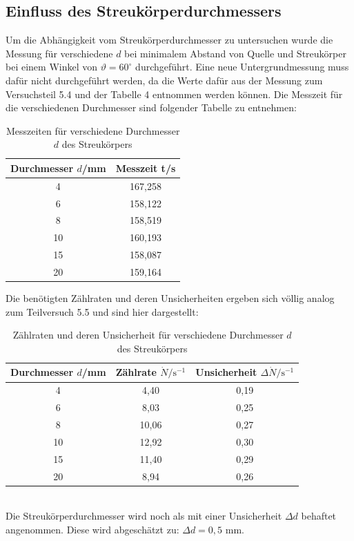 \documentclass[german,  %
parskip=full,  %
]{scrartcl}
\begin{document}
\subsection{Einfluss des Streukörperdurchmessers}
Um die Abhängigkeit vom Streukörperdurchmesser zu untersuchen wurde die Messung für verschiedene $d$ bei minimalem Abstand von Quelle und Streukörper bei einem Winkel von $\vartheta = 60^{\circ}$ durchgeführt. Eine neue Untergrundmessung muss dafür nicht durchgeführt werden, da die Werte dafür aus der Messung zum Versuchsteil 5.4 und der Tabelle 4 entnommen werden können. Die Messzeit für die verschiedenen Durchmesser sind folgender Tabelle zu entnehmen:
\newpage
\begin{table}[h!]\centering
\begin{tabular}{|c|c|}\hline
Durchmesser $d$/mm & Messzeit t/s \\\hline
4  &  167,258		\\\hline
6  & 158,122	\\\hline
8   &  158,519	\\\hline
10   &  160,193	\\\hline
15   & 158,087	\\\hline
20 & 159,164	\\\hline
\end{tabular}
\caption{Messzeiten für verschiedene Durchmesser $d$ des Streukörpers}
\end{table}
Die benötigten Zählraten und deren Unsicherheiten ergeben sich völlig analog zum Teilversuch 5.5 und sind hier dargestellt:
\\
\begin{table}[h!]\centering
\begin{tabular}{|c|c|c|}\hline
Durchmesser $d$/mm & Zählrate $\dot{N}/\text{s}^{-1}$ & Unsicherheit $\Delta \dot{N}/\text{s}^{-1}$  \\\hline
4  &  4,40 & 0,19		\\\hline
6  & 8,03 & 0,25	\\\hline
8   &  10,06 & 0,27	\\\hline
10   &  12,92 & 0,30	\\\hline
15   & 11,40 & 0,29	\\\hline
20 & 8,94 & 0,26	\\\hline
\end{tabular}
\caption{Zählraten und deren Unsicherheit für verschiedene Durchmesser $d$ des Streukörpers}
\end{table}
\\
Die Streukörperdurchmesser wird noch als mit einer Unsicherheit $\Delta d$ behaftet angenommen. Diese wird abgeschätzt zu: $\Delta d = 0,5 $ mm.
\end{document}
